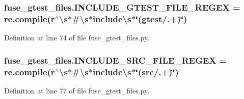 \subsubsection[{\texorpdfstring{I\+N\+C\+L\+U\+D\+E\+\_\+\+G\+T\+E\+S\+T\+\_\+\+F\+I\+L\+E\+\_\+\+R\+E\+G\+EX}{INCLUDE_GTEST_FILE_REGEX}}]{\setlength{\rightskip}{0pt plus 5cm}fuse\+\_\+gtest\+\_\+files.\+I\+N\+C\+L\+U\+D\+E\+\_\+\+G\+T\+E\+S\+T\+\_\+\+F\+I\+L\+E\+\_\+\+R\+E\+G\+EX = re.\+compile(r\textquotesingle{}$^\wedge$\textbackslash{}s$\ast$\#\textbackslash{}s$\ast$include\textbackslash{}s$\ast$\char`\"{}(gtest/.+)\char`\"{}\textquotesingle{})}\hypertarget{namespacefuse__gtest__files_ad7abe9bfa06bb1c5411e8b4a7a686e5b}{}\label{namespacefuse__gtest__files_ad7abe9bfa06bb1c5411e8b4a7a686e5b}


Definition at line 74 of file fuse\+\_\+gtest\+\_\+files.\+py.

\subsubsection[{\texorpdfstring{I\+N\+C\+L\+U\+D\+E\+\_\+\+S\+R\+C\+\_\+\+F\+I\+L\+E\+\_\+\+R\+E\+G\+EX}{INCLUDE_SRC_FILE_REGEX}}]{\setlength{\rightskip}{0pt plus 5cm}fuse\+\_\+gtest\+\_\+files.\+I\+N\+C\+L\+U\+D\+E\+\_\+\+S\+R\+C\+\_\+\+F\+I\+L\+E\+\_\+\+R\+E\+G\+EX = re.\+compile(r\textquotesingle{}$^\wedge$\textbackslash{}s$\ast$\#\textbackslash{}s$\ast$include\textbackslash{}s$\ast$\char`\"{}(src/.+)\char`\"{}\textquotesingle{})}\hypertarget{namespacefuse__gtest__files_aec4e054d0ab27276d6150468bb98a8a4}{}\label{namespacefuse__gtest__files_aec4e054d0ab27276d6150468bb98a8a4}


Definition at line 77 of file fuse\+\_\+gtest\+\_\+files.\+py.

